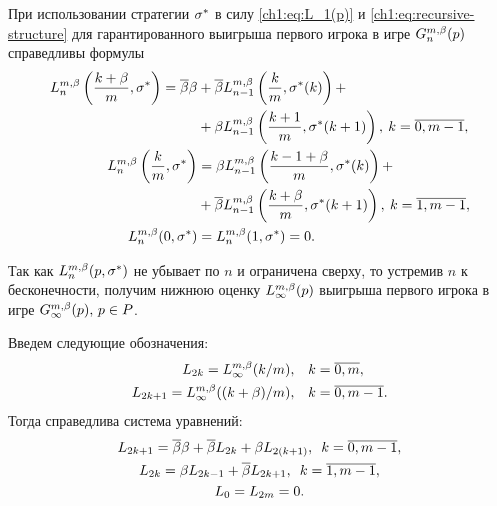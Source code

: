 {При использовании стратегии $\sigma^*$ в силу \eqref{ch1:eq:L_1(p)} и \eqref{ch1:eq:recursive-structure} для гарантированного выигрыша первого игрока в игре $\theG*{n}(p)$ справедливы формулы
\begin{equation}
  \begin{aligned}
    \label{ch1:eq:lowerBound:recurrence:function}
    \L*{n}\left(\frac{k + \Co}{m}, \sigmar^*\right)
    = \DCo\Co &+ \DCo\L*{n-1}\left(\frac{k}{m}, \sigmaran{*}{k}\right) + \\
    &+\Co\L*{n-1}\left(\frac{k+1}{m}, \sigmaran{*}{k+1}\right), \: k = \overline{0, m-1}, \\
    \L*{n}\left(\frac{k}{m}, \sigmar^*\right)
    &= \Co\L*{n-1}\left(\frac{k - 1 + \Co}{m}, \sigmaran{*}{k}\right) + \\
    &+ \DCo\L*{n-1}\left(\frac{k + \Co}{m}, \sigmaran{*}{k+1}\right), \: k = \overline{1, m-1}, \\
    \L*{n}(0, \sigmar^*) &= \L*{n}(1, \sigmar^*) = 0.
  \end{aligned}
\end{equation}

Так как $\L*{n}(p, \sigmar^*)$ не убывает по $n$ и ограничена сверху, то устремив $n$ к бесконечности, получим нижнюю оценку $\L*{\infty}(p)$ выигрыша первого игрока в игре $\theG*{\infty}(p), \, p \in P$.

Введем следующие обозначения:
\begin{align*}
  L_{2k} = \L*{\infty}(k/m), & \quad k = \overline{0, m},\\
  L_{2k+1} = \L*{\infty}((k+\Co)/m), & \quad k = \overline{0, m-1}.
\end{align*}
Тогда справедлива система уравнений:
\begin{equation}
  \label{ch1:eq:lowerRecurrence}
  \begin{gathered}
    L_{2k+1} = {{\overline{\beta}}}\beta + {{\overline{\beta}}} L_{2k} + \beta L_{2(k+1)}, \enskip k = \overline{0, m-1},\\
    L_{2k} = \beta L_{2k-1} + {{\overline{\beta}}} L_{2k+1}, \enskip k = \overline{1, m-1},\\
    L_0 = L_{2m} = 0.
  \end{gathered}
\end{equation}

}
